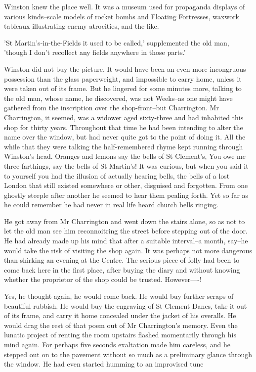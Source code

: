 \documentclass{article}
\begin{document}
Winston knew the place well. It was a museum used for propaganda displays
of various kinds--scale models of rocket bombs and Floating Fortresses,
waxwork tableaux illustrating enemy atrocities, and the like.

'St Martin's-in-the-Fields it used to be called,' supplemented the old man,
'though I don't recollect any fields anywhere in those parts.'

Winston did not buy the picture. It would have been an even more
incongruous possession than the glass paperweight, and impossible to carry
home, unless it were taken out of its frame. But he lingered for some
minutes more, talking to the old man, whose name, he discovered, was not
Weeks--as one might have gathered from the inscription over the
shop-front--but Charrington. Mr Charrington, it seemed, was a widower aged
sixty-three and had inhabited this shop for thirty years. Throughout that
time he had been intending to alter the name over the window, but had never
quite got to the point of doing it. All the while that they were talking
the half-remembered rhyme kept running through Winston's head. Oranges and
lemons say the bells of St Clement's, You owe me three farthings, say
the bells of St Martin's! It was curious, but when you said it to yourself
you had the illusion of actually hearing bells, the bells of a lost London
that still existed somewhere or other, disguised and forgotten. From one
ghostly steeple after another he seemed to hear them pealing forth. Yet so
far as he could remember he had never in real life heard church bells
ringing.

He got away from Mr Charrington and went down the stairs alone, so as not
to let the old man see him reconnoitring the street before stepping out of
the door. He had already made up his mind that after a suitable
interval--a month, say--he would take the risk of visiting the shop again.
It was perhaps not more dangerous than shirking an evening at the Centre.
The serious piece of folly had been to come back here in the first place,
after buying the diary and without knowing whether the proprietor of the
shop could be trusted. However----!

Yes, he thought again, he would come back. He would buy further scraps of
beautiful rubbish. He would buy the engraving of St Clement Danes, take
it out of its frame, and carry it home concealed under the jacket of his
overalls. He would drag the rest of that poem out of Mr Charrington's
memory. Even the lunatic project of renting the room upstairs flashed
momentarily through his mind again. For perhaps five seconds exaltation
made him careless, and he stepped out on to the pavement without so much
as a preliminary glance through the window. He had even started humming
to an improvised tune
\end{document}
